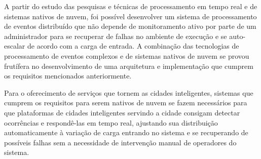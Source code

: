 A partir do estudo das pesquisas e técnicas de processamento em tempo real e de sistemas nativos de nuvem, foi possível desenvolver um sistema de processamento de eventos distribuído que não depende de monitoramento ativo por parte de um administrador para se recuperar de falhas no ambiente de execução e se auto-escalar de acordo com a carga de entrada.
A combinação das tecnologias de processamento de eventos complexos e de sistemas nativos de nuvem se provou frutífera no desenvolvimento de uma arquitetura e implementação que cumprem os requisitos mencionados anteriormente.

Para o oferecimento de serviços que tornem as cidades inteligentes, sistemas que cumprem os requisitos para serem nativos de nuvem se fazem necessários para que plataformas de cidades inteligentes servindo a cidade consigam detectar ocorrências e respondê-las em tempo real, ajustando sua distribuição automaticamente à variação de carga entrando no sistema e se recuperando de possíveis falhas sem a necessidade de intervenção manual de operadores do sistema.


















